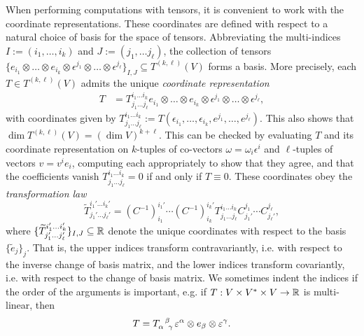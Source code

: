 When performing computations with tensors, it is convenient to work with the coordinate representations. These coordinates are defined with respect to a natural choice of basis for the space of tensors. Abbreviating the multi-indices $I:= (i_1, \dots, i_k)$ and $J := (j_1 ,\dots j_\ell)$, the collection of tensors $\{ e_{i_1} \otimes \dots \otimes e_{i_k} \otimes \epsilon^{j_1} \otimes \dots \otimes \epsilon^{j_\ell} \}_{I, J} \subseteq T^{(k, \ell)} (V)$ forms a basis. More precisely, each $T \in T^{(k, \ell)} (V)$ admits the unique \emph{coordinate representation}
		\begin{align*}
			T 
				&= T^{i_1\dots i_k}_{j_1 \dots j_\ell} e_{i_1} \otimes \dots \otimes e_{i_k} \otimes \epsilon^{j_1} \otimes \dots \otimes \epsilon^{j_\ell} ,
		\end{align*}
	with coordinates given by $T^{i_1\dots i_k}_{j_1 \dots j_\ell} := T(\epsilon_{i_1}, \dots , \epsilon_{i_k} ,e^{j_1} , \dots, e^{j_\ell})$. This also shows that $\dim T^{(k, \ell)} (V) = (\dim V)^{k + \ell}$. This can be checked by evaluating $T$ and its coordinate representation on $k$-tuples of co-vectors $\omega = \omega_i \epsilon^i$ and $\ell$-tuples of vectors $v = v^i e_i$, computing each appropriately to show that they agree, and that the coefficients vanish $ T^{i_1\dots i_k}_{j_1 \dots j_\ell} = 0$ if and only if $T \equiv 0$. These coordinates obey the \emph{transformation law}
		\[ \widetilde T^{i_1'\dots i_k'}_{j_1' \dots j_\ell'} = (C^{-1})^{i_1'}_{i_1} \cdots  (C^{-1})^{i_k'}_{i_k} T^{i_1\dots i_k}_{j_1\dots j_\ell} C^{j_1}_{j_1'} \cdots C^{j_\ell}_{j_\ell'}, \]
	where $\{ \widetilde T^{i_1'\dots i_k'}_{j_1' \dots j_\ell'} \}_{I, J} \subseteq \mathbb R$ denote the unique coordinates with respect to the basis $\{\widetilde e_j\}_j$. That is, the upper indices transform contravariantly, i.e. with respect to the inverse change of basis matrix, and the lower indices transform covariantly, i.e. with respect to the change of basis matrix. We sometimes indent the indices if the order of the arguments is important, e.g. if $T: V \times V^* \times V \to \mathbb R$ is multi-linear, then 
		\[ T = T\indices{_\alpha^\beta_\gamma} \epsilon^\alpha \otimes e_\beta \otimes \epsilon^\gamma. \] 

